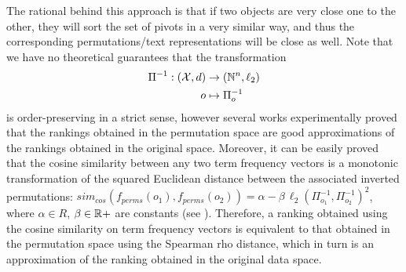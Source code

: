 The rational behind this approach is that if two objects are very close one to the other, they will sort the set of pivots in a very similar way, and thus the corresponding permutations/text representations will be close as well.
Note that we have no theoretical guarantees that the transformation
\begin{align}
\Pi^{-1} : (\mathcal{X},d) &\to (\mathbb{N}^n, \ell_2)\\
o &\mapsto \Pi^{-1}_{o}
\end{align}
is order-preserving in a strict sense, however several works \cite{amato2014mi,gonzalez2008effective,esuli2009mipai} experimentally proved that the rankings obtained in the permutation space are good approximations of the rankings obtained in the original space.
Moreover, it can be easily proved that the cosine similarity between any two term frequency vectors is a monotonic transformation of the squared Euclidean distance between the associated inverted permutations: $sim_{cos}(f_{perms}(o_1), f_{perms}(o_2))=\alpha - \beta\,\ell_2(\Pi^{-1}_{o_1},\Pi^{-1}_{o_2})^2 $, where $\alpha \in R{}$, $\beta \in \mathbb{R}+$ are constants (see \cite{vadicamo2016using,vadicamo2018enhancing}).
Therefore, a ranking obtained using the cosine similarity on term frequency vectors is equivalent to that obtained in the permutation space using the Spearman rho distance, which in turn is an approximation of the ranking obtained in the original data space.

